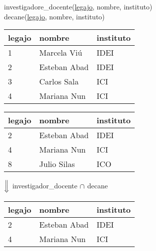 \documentclass[preview]{standalone}
\begin{document}
investigadore\_docente(\underline{legajo}, nombre, instituto)\\
decane(\underline{legajo}, nombre, instituto)

\begin{center}
\begin{tabular}{| l | l | l |}\hline
	legajo & nombre & instituto \\\hline			
	1 & Marcela Vi\'u  & IDEI \\
	2 & Esteban Abad &  IDEI \\
	3 & Carlos Sala & ICI \\
	4 & Mariana Nun & ICI \\\hline
\end{tabular}
\quad
\begin{tabular}{| l | l | l |}\hline
	legajo & nombre & instituto \\\hline			
	2 & Esteban Abad &  IDEI \\
	4 & Mariana Nun & ICI \\
	8 & Julio Silas & ICO \\\hline
\end{tabular}
\vspace{.35cm}

$\Big\Downarrow$ investigador\_docente ${\Large\cap}$ decane
\vspace{.35cm}

\begin{tabular}{| l | l | l |}\hline
	legajo & nombre & instituto \\\hline			
	2 & Esteban Abad &  IDEI \\
	4 & Mariana Nun & ICI \\\hline
\end{tabular}
\end{center}
\end{document}
